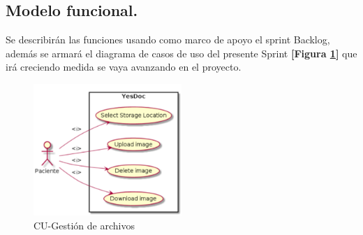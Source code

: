 \documentclass[a4paper,12pt]{article}
\begin{document}
\subsection{ Modelo funcional.} %
Se describirán las funciones usando como marco de apoyo el sprint Backlog, además se armará el diagrama de casos de uso del presente Sprint \textbf{[Figura \ref{6-cu_file_upload}]} que irá creciendo  medida se vaya avanzando en el proyecto.

    \begin{figure}[h]
        \centering
        \includegraphics[width=0.5\textwidth]{img/cu_file_upload}
        \caption{CU-Gestión de archivos}
		\label{6-cu_file_upload}
    \end{figure}
\end{document}
